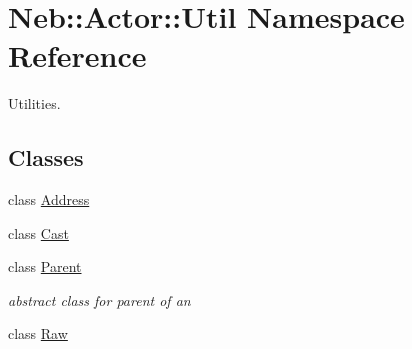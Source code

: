 \hypertarget{namespaceNeb_1_1Actor_1_1Util}{\section{Neb\-:\-:Actor\-:\-:Util Namespace Reference}
\label{namespaceNeb_1_1Actor_1_1Util}
}


Utilities.  


\subsection*{Classes}
\begin{DoxyCompactItemize}
\item 
class \hyperlink{classNeb_1_1Actor_1_1Util_1_1Address}{Address}
\item 
class \hyperlink{classNeb_1_1Actor_1_1Util_1_1Cast}{Cast}
\item 
class \hyperlink{classNeb_1_1Actor_1_1Util_1_1Parent}{Parent}
\begin{DoxyCompactList}\small\item\em abstract class for parent of an  \end{DoxyCompactList}\item 
class \hyperlink{classNeb_1_1Actor_1_1Util_1_1Raw}{Raw}
\end{DoxyCompactItemize}
